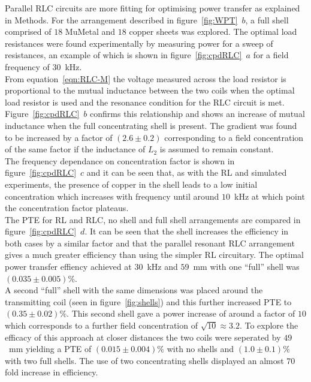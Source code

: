 \documentclass[11pt]{iopart}
\begin{document}
Parallel RLC circuits are more fitting for optimising power
transfer as explained in Methods. For the arrangement
described in figure~\ref{fig:WPT}~$b$, a full shell comprised of $18$
MuMetal and $18$ copper sheets was explored. The optimal load
resistances were found experimentally by measuring power for a sweep
of resistances, an example of which is shown in
figure~\ref{fig:cpdRLC}~$a$ for a field frequency of $30$~kHz.\\
From equation~\ref{eqn:RLC-M} the voltage measured across the load
resistor is proportional to the mutual inductance between the two
coils when the optimal load resistor is used and the resonance
condition for the RLC circuit is met. Figure~\ref{fig:cpdRLC}~$b$
confirms this relationship and shows an increase of mutual inductance
when the full concentrating shell is present. The gradient was found
to be increased by a factor of $(2.6 \pm 0.2)$ corresponding to a field
concentration of the same factor if the inductance of $L_2$ is assumed
to remain constant. \\
The frequency dependance on concentration factor is shown in
figure~\ref{fig:cpdRLC}~$c$ and it can be seen that, as with the RL and
simulated experiments, the presence of copper in the shell leads to a
low initial concentration which increases with frequency until around
$10$~kHz at which point the concentration factor plateaus.\\
The PTE for RL and RLC, no shell and full shell arrangements are
compared in figure~\ref{fig:cpdRLC}~$d$. It can be seen that the shell
increases the efficiency in both cases by a similar factor and that
the parallel resonant RLC arrangement gives a much greater efficiency
than using the simpler RL circuitary. The optimal power transfer
effiency achieved at $30$~kHz and $59$~mm with one ``full'' shell was
$(0.035\pm0.005)\%$. \\ A second ``full'' shell with the same
dimensions was placed around the transmitting coil (seen in figure~\ref{fig:shells}) and this further
increased PTE to $(0.35\pm0.02)\%$. This second shell gave a power
increase of around a factor of $10$ which corresponds to a further
field concentration of $\sqrt{10} \approx 3.2$. To explore the
efficacy of this approach at closer distances the two coils were
seperated by $49$~mm yielding a PTE of $(0.015\pm0.004)\%$ with no
shells and $(1.0\pm0.1)\%$ with two full shells. The use of two
concentrating shells displayed an almost $70$ fold increase in
efficiency.
\end{document}
